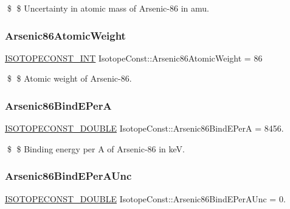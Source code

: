 \$ \$ Uncertainty in atomic mass of Arsenic-\/86 in amu. \mbox{\label{group___isotope_const-_arsenic-_as86_ga270ebfdf267f90df91018f307014ab83}} 
\subsubsection{\texorpdfstring{Arsenic86\+Atomic\+Weight}{Arsenic86AtomicWeight}}
{\footnotesize\ttfamily \mbox{\hyperlink{group___isotope_const-_macros_ga5f18360b3e99483a35c32d789e62621c}{I\+S\+O\+T\+O\+P\+E\+C\+O\+N\+S\+T\+\_\+\+I\+NT}} Isotope\+Const\+::\+Arsenic86\+Atomic\+Weight = 86}

\$ \$ Atomic weight of Arsenic-\/86. \mbox{\label{group___isotope_const-_arsenic-_as86_gaac9efb273083e4116c9d881861365318}} 
\subsubsection{\texorpdfstring{Arsenic86\+Bind\+E\+PerA}{Arsenic86BindEPerA}}
{\footnotesize\ttfamily \mbox{\hyperlink{group___isotope_const-_macros_ga8f45a7272ce02c0b4c65c44636ed719a}{I\+S\+O\+T\+O\+P\+E\+C\+O\+N\+S\+T\+\_\+\+D\+O\+U\+B\+LE}} Isotope\+Const\+::\+Arsenic86\+Bind\+E\+PerA = 8456.}

\$ \$ Binding energy per A of Arsenic-\/86 in keV. \mbox{\label{group___isotope_const-_arsenic-_as86_gad4b0e8ae7ed24018acae79dd77306714}} 
\subsubsection{\texorpdfstring{Arsenic86\+Bind\+E\+Per\+A\+Unc}{Arsenic86BindEPerAUnc}}
{\footnotesize\ttfamily \mbox{\hyperlink{group___isotope_const-_macros_ga8f45a7272ce02c0b4c65c44636ed719a}{I\+S\+O\+T\+O\+P\+E\+C\+O\+N\+S\+T\+\_\+\+D\+O\+U\+B\+LE}} Isotope\+Const\+::\+Arsenic86\+Bind\+E\+Per\+A\+Unc = 0.}

